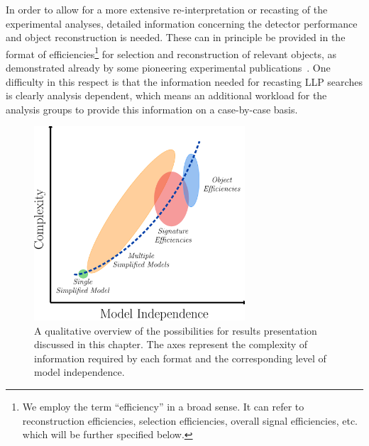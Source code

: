 In order to allow for a more extensive re-interpretation or recasting of 
the experimental analyses, detailed information concerning the detector
performance and object reconstruction is needed.
These can in principle be provided in the format of efficiencies\footnote{We
employ the term ``efficiency'' in a broad sense. It can refer to reconstruction
efficiencies, selection efficiencies, overall signal efficiencies, etc. which will be further specified below.}
for selection and reconstruction of relevant objects, as demonstrated
already by some pioneering experimental publications~\cite{Khachatryan:2015lla,Aaboud:2017iio}.
One difficulty in this respect is that the information needed for recasting LLP searches is clearly
analysis dependent, which means an additional workload for the analysis groups to provide this information 
on a case-by-case basis.

\begin{figure}[t]
\begin{center}
\includegraphics[width=0.7\textwidth,angle=0]{ch5-figures/LLP_interpretationsB.png}
\end{center}
\caption{A qualitative overview of the possibilities
for results presentation discussed in this chapter.
The axes represent the complexity of information required by each
format and the corresponding level of model independence.}
\label{fig:ch5-complexity-vs-modelindependence}
\end{figure}

